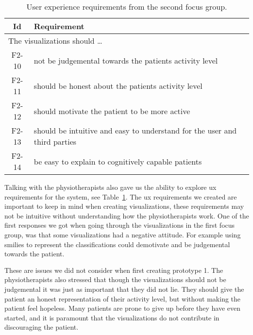 \begin{table}[h!]
  \begin{center}
  \begin{tabular}{|c|p{12cm}|}
    \hline
      \textbf{Id} & \textbf{Requirement} \\ \hline
    \multicolumn{2}{|l|}{The visualizations should \ldots} \\ \hline
      F2-10 & not be judgemental towards the patients activity level \\ \hline
      F2-11 & should be honest about the patients activity level \\ \hline
      F2-12 & should motivate the patient to be more active \\ \hline
      F2-13 & should be intuitive and easy to understand for the user and third parties \\ \hline
      F2-14 & be easy to explain to cognitively capable patients \\ \hline
  \end{tabular}
  \end{center}
  \caption[User experience requirements after the second focus group.]{User experience requirements from the second focus group.}
  \label{tab:f2ReqUx}
\end{table}

Talking with the physiotherapists also gave us the ability to explore \gls{ux} requirements for the system, see Table~\ref{tab:f2ReqUx}. The \gls{ux} requirements we created are important to keep in mind when creating visualizations, these requirements may not be intuitive without understanding how the physiotherapists work. One of the first responses we got when going through the visualizations in the first focus group, was that some visualizations had a negative attitude. For example using smilies to represent the classifications could demotivate and be judgemental towards the patient. 

These are issues we did not consider when first creating prototype 1. The physiotherapists also stressed that though the visualizations should not be judgemental it was just as important that they did not lie. They should give the patient an honest representation of their activity level, but without making the patient feel hopeless. Many patients are prone to give up before they have even started, and it is paramount that the visualizations do not contribute in discouraging the patient.

